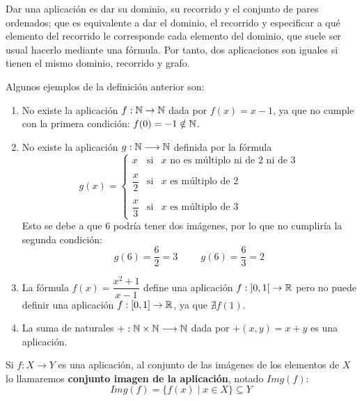 Dar una aplicación es dar su dominio, su recorrido y el conjunto de pares ordenados; que es equivalente a dar el dominio, el recorrido y especificar a qué elemento del recorrido le corresponde cada elemento del dominio, que suele ser usual hacerlo mediante una fórmula. Por tanto, dos aplicaciones son iguales si tienen el mismo dominio, recorrido y grafo.

\begin{ejemplo} Algunos ejemplos de la definición anterior son:
\begin{enumerate}
    \item No existe la aplicación $f:\mathbb N \rightarrow \mathbb N$ dada por $f(x) = x-1$, ya que no cumple con la primera condición: $f(0)=-1\notin\mathbb N$.

    \item No existe la aplicación $g:\mathbb{N}\longrightarrow \mathbb{N}$ definida por la fórmula
    \begin{equation*}
        g(x)=\left\{
        \begin{array}{ccl}
            x & \text{si} & x \text{ no es múltiplo ni de $2$ ni de $3$} \\ \\
            \dfrac{x}{2} & \text{si} & x \text{ es múltiplo de $2$} \\ \\
            \dfrac{x}{3} & \text{si} & x \text{ es múltiplo de $3$}
        \end{array}
        \right.
    \end{equation*}
    Esto se debe a que $6$ podría tener dos imágenes, por lo que no cumpliría la segunda condición:
    \begin{equation*}
        g(6)=\frac{6}{2}=3
        \hspace{1cm}
        g(6)=\frac{6}{3}=2
    \end{equation*}

    \item La fórmula $f(x) = \dfrac{x^2+1}{x-1}$ define una aplicación $f:\left]0,1\right[ \rightarrow \mathbb R$ pero no puede definir una aplicación $f:[0,1] \rightarrow \mathbb R$, ya que $\nexists f(1)$.

    \item La suma de naturales $+:\mathbb{N}\times \mathbb{N}\longrightarrow \mathbb{N}$ dada por $+(x,y) = x+y$ es una aplicación.
\end{enumerate}
\end{ejemplo}


\begin{definicion}
    Si $f:X \rightarrow Y$ es una aplicación, al conjunto de las imágenes de los elementos de $X$ lo
    llamaremos \textbf{conjunto imagen de la aplicación}, notado $Img(f)$:
    $$Img(f) = \{f(x) \mid x \in X\} \subseteq Y$$
\end{definicion}

